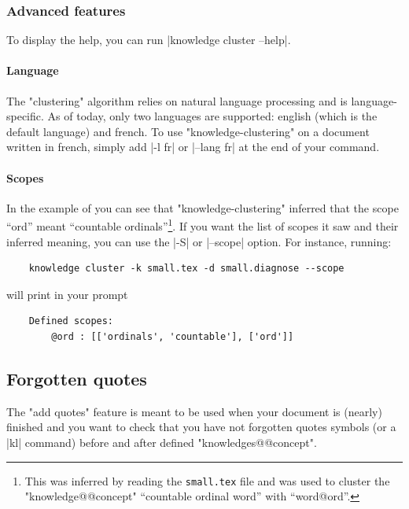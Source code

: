 \documentclass{article}
\begin{document}
\subsubsection{Advanced features}

To display the help, you can run \spverb|knowledge cluster --help|.

\paragraph{Language} The "clustering" algorithm relies on natural language 
processing and is language-specific. As of today, only two languages
are supported: english (which is the default language) and french.
To use "knowledge-clustering" on a document written in french,
simply add \spverb|-l fr| or \spverb|--lang fr| at the end of your command.


\paragraph{Scopes} In the example of
you can see that "knowledge-cluste\-ring" inferred that the
scope ``ord'' meant ``countable ordinals''\footnote{This was inferred
by reading the \texttt{small.tex} file and was used to cluster
the "knowledge@@concept" ``countable ordinal word'' with ``word@ord''.}.
If you want the list of scopes it saw
and their inferred meaning, you can use the \spverb|-S| or \spverb|--scope| 
option. 
For instance, running:
\begin{verbatim}
    knowledge cluster -k small.tex -d small.diagnose --scope
\end{verbatim}
will print in your prompt
\begin{verbatim}
    Defined scopes:
	    @ord : [['ordinals', 'countable'], ['ord']]
\end{verbatim}


\subsection{Forgotten quotes}


The "add quotes" feature is meant to be used when your document is (nearly)
finished and you want to check that you have not forgotten quotes symbols
(or a \spverb|kl{}| command) before and after defined "knowledges@@concept".
\end{document}
